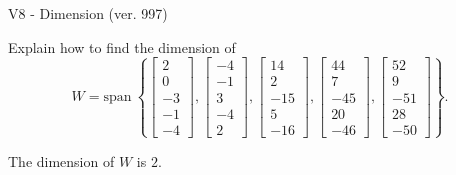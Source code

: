 \begin{exercise}
  \begin{exerciseTitle}V8 - Dimension (ver. 997)\end{exerciseTitle}
  \begin{exerciseStatement}
    Explain how to find the dimension of 
\[W=\mathrm{span}\ \left\{\left[\begin{array}{r}
2 \\
0 \\
-3 \\
-1 \\
-4
\end{array}\right] , \left[\begin{array}{r}
-4 \\
-1 \\
3 \\
-4 \\
2
\end{array}\right] , \left[\begin{array}{r}
14 \\
2 \\
-15 \\
5 \\
-16
\end{array}\right] , \left[\begin{array}{r}
44 \\
7 \\
-45 \\
20 \\
-46
\end{array}\right] , \left[\begin{array}{r}
52 \\
9 \\
-51 \\
28 \\
-50
\end{array}\right]\right\}.\]



  \end{exerciseStatement}
  \begin{exerciseAnswer}
   The dimension of \(W\) is  \(2\).
  


  \end{exerciseAnswer}
\end{exercise}